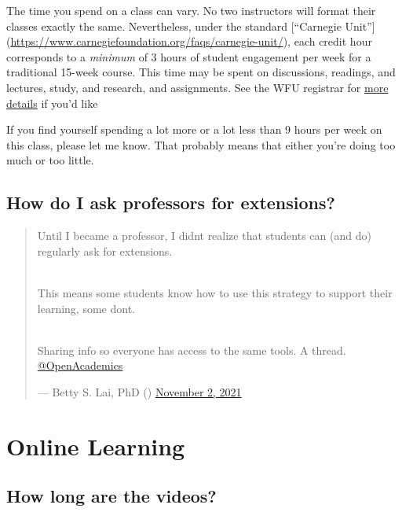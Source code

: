 The time you spend on a class can vary. No two instructors will format their classes exactly the same. Nevertheless, under the standard {[}``Carnegie Unit''{]} (\url{https://www.carnegiefoundation.org/faqs/carnegie-unit/}), each credit hour corresponds to a \emph{minimum} of 3 hours of student engagement per week for a traditional 15-week course. This time may be spent on discussions, readings, and lectures, study, and research, and assignments. See the WFU registrar for \href{https://registrar.wfu.edu/semester-credit-hour/}{more details} if you'd like

If you find yourself spending a lot more or a lot less than 9 hours per week on this class, please let me know. That probably means that either you're doing too much or too little.

\hypertarget{how-do-i-ask-professors-for-extensions}{%
\subsection{How do I ask professors for extensions?}\label{how-do-i-ask-professors-for-extensions}}

\begin{quote}
Until I became a professor, I didn\textquotesingle t realize that students can (and
do) regularly ask for extensions.\\
\strut \\
This means some students know how to use this strategy to support
their learning, some don\textquotesingle t.\\
\strut \\
Sharing info so everyone has access to the same tools. A thread.
\href{https://twitter.com/OpenAcademics}{@OpenAcademics}

\begin{flushright}--- Betty S. Lai, PhD (\citet{BettySLai}) \href{https://twitter.com/BettySLai/status/1455555111397117954}{November 2,
2021}\end{flushright}
\end{quote}

\hypertarget{online-learning}{%
\section{Online Learning}\label{online-learning}}

\hypertarget{how-long-are-the-videos}{%
\subsection{How long are the videos?}\label{how-long-are-the-videos}}

